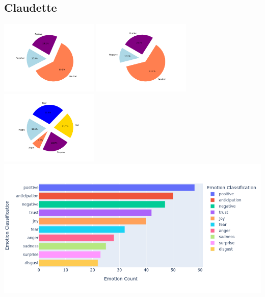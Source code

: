 \documentclass[a4paper,12pt]{article}
\begin{document}
	\subsection{Claudette}
	{\includegraphics[height=3.5cm]{claudettesVaderEmotionalPie.png}}
	{\includegraphics[height=3.5cm]{claudettesBlobEmotionalPie.png}}
	{\includegraphics[height=3.5cm]{claudettesEmotionalPie.png}}\\
	{\includegraphics[width=17cm]{claudetteNrcImage.png}}\\
	\clearpage
\end{document}
